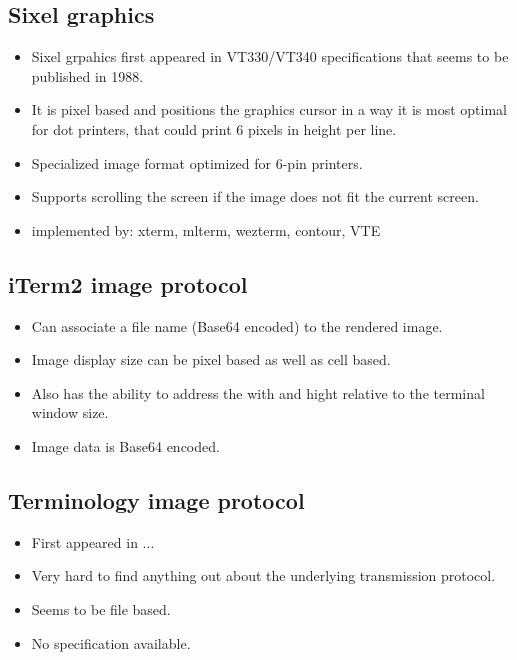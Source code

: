 \documentclass{article}
\begin{document}
\subsection{Sixel graphics}

\begin{itemize}
    \item Sixel grpahics first appeared in VT330/VT340 specifications that seems to be published in 1988.
    \item It is pixel based and positions the graphics cursor in a way it is most optimal for dot printers,
        that could print 6 pixels in height per line.
    \item Specialized image format optimized for 6-pin printers.
    \item Supports scrolling the screen if the image does not fit the current screen.
    \item implemented by: xterm, mlterm, wezterm, contour, VTE
\end{itemize}

\subsection{iTerm2 image protocol}

\begin{itemize}
    \item Can associate a file name (Base64 encoded) to the rendered image.
    \item Image display size can be pixel based as well as cell based.
    \item Also has the ability to address the with and hight relative to the terminal window size.
    \item Image data is Base64 encoded.
\end{itemize}


\subsection{Terminology image protocol}

\begin{itemize}
    \item First appeared in ... 
    \item Very hard to find anything out about the underlying transmission protocol.
    \item Seems to be file based.
    \item No specification available.
\end{itemize}
\end{document}
